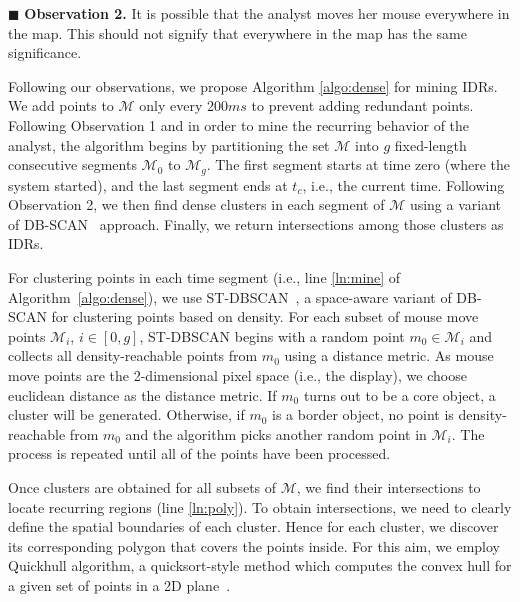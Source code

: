 \vspace{2pt}
\noindent $\blacksquare$ {\bf Observation 2.} It is possible that the analyst moves her mouse everywhere in the map. This should not signify that everywhere in the map has the same significance.

\vspace{2pt}
Following our observations, we propose Algorithm \ref{algo:dense} for mining IDRs. We add points to $\mathcal{M}$ only every $200ms$ to prevent adding redundant points.  Following Observation 1 and in order to mine the recurring behavior of the analyst, the algorithm begins by partitioning the set $\mathcal{M}$ into $g$ fixed-length consecutive segments $\mathcal{M}_0$ to $\mathcal{M}_g$. The first segment starts at time zero (where the system started), and the last segment ends at $t_c$, i.e., the current time. Following Observation 2, we then find dense clusters in each segment of $\mathcal{M}$ using a variant of DB-SCAN~\cite{Ester:1996} approach. Finally, we return intersections among those clusters as IDRs.

\vspace{2pt}
For clustering points in each time segment (i.e., line \ref{ln:mine} of Algorithm~\ref{algo:dense}), we use ST-DBSCAN~\cite{Birant:2007}, a space-aware variant of DB-SCAN for clustering points based on density. For each subset of mouse move points $\mathcal{M}_i$, $i \in [0,g]$, ST-DBSCAN begins with a random point $m_0 \in \mathcal{M}_i$ and collects all density-reachable points from $m_0$ using a distance metric. As mouse move points are the 2-dimensional pixel space (i.e., the display), we choose euclidean distance as the distance metric. If $m_0$ turns out to be a core object, a cluster will be generated. Otherwise, if $m_0$ is a border object, no point is density-reachable from $m_0$ and the algorithm picks another random point in $\mathcal{M}_i$. The process is repeated until all of the points have been processed.

\vspace{2pt}
Once clusters are obtained for all subsets of $\mathcal{M}$, we find their intersections to locate recurring regions (line \ref{ln:poly}). To obtain intersections, we need to clearly define the spatial boundaries of each cluster. Hence for each cluster, we discover its corresponding polygon that covers the points inside. For this aim, we employ Quickhull algorithm, a quicksort-style method which computes the convex hull for a given set of points in a 2D plane~\cite{Barber:1996}.

